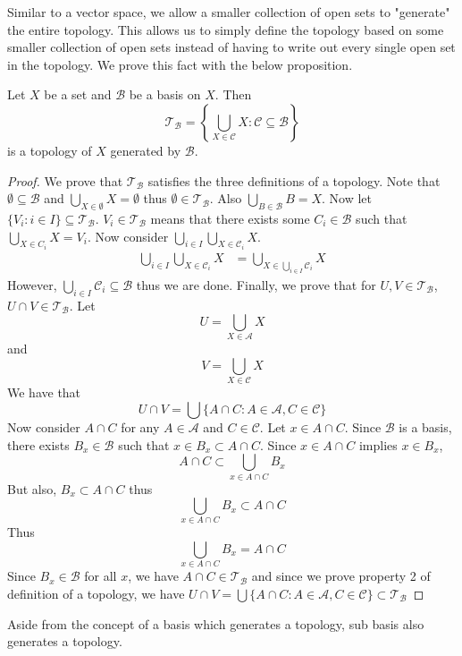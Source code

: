 Similar to a vector space, we allow a smaller collection of open sets to "generate" the entire topology. This allows us to simply define the topology based on some smaller collection of open sets instead of having to write out every single open set in the topology. We prove this fact with the below proposition. 

\begin{prp}{}{} Let $X$ be a set and $\mathcal{B}$ be a basis on $X$. Then $$\mathcal{T}_\mathcal{B}=\left\{\bigcup_{X\in\mathcal{C}}X:\mathcal{C}\subseteq\mathcal{B}\right\}$$ is a topology of $X$ generated by $\mathcal{B}$. \tcbline
\begin{proof} We prove that $\mathcal{T}_\mathcal{B}$ satisfies the three definitions of a topology. Note that $\emptyset\subseteq\mathcal{B}$ and $\bigcup_{X\in\emptyset}X=\emptyset$ thus $\emptyset\in\mathcal{T}_\mathcal{B}$. Also $\bigcup_{B\in\mathcal{B}}B=X$. Now let $\{V_i:i\in I\}\subseteq\mathcal{T}_\mathcal{B}$. $V_i\in\mathcal{T}_\mathcal{B}$ means that there exists some $C_i\in\mathcal{B}$ such that $\bigcup_{X\in C_i}X=V_i$. Now consider $\bigcup_{i\in I}\bigcup_{X\in\mathcal{C}_i}X$. 
\begin{align*}
\bigcup_{i\in I}\bigcup_{X\in\mathcal{C}_i}X&=\bigcup_{X\in\bigcup_{i\in I}\mathcal{C}_i}X
\end{align*} However, $\bigcup_{i\in I}\mathcal{C}_i\subseteq\mathcal{B}$ thus we are done. Finally, we prove that for $U,V\in\mathcal{T}_\mathcal{B}$, $U\cap V\in\mathcal{T}_\mathcal{B}$. Let $$U=\bigcup_{X\in\mathcal{A}}X$$ and $$V=\bigcup_{X\in\mathcal{C}}X$$ We have that $$U\cap V=\bigcup\{A\cap C:A\in\mathcal{A}, C\in\mathcal{C}\}$$ Now consider $A\cap C$ for any $A\in\mathcal{A}$ and $C\in\mathcal{C}$. Let $x\in A\cap C$. Since $\mathcal{B}$ is a basis, there exists $B_x\in\mathcal{B}$ such that $x\in B_x\subset A\cap C$. Since $x\in A\cap C$ implies $x\in B_x$, $$A\cap C\subset\bigcup_{x\in A\cap C}B_x$$ But also, $B_x\subset A\cap C$ thus $$\bigcup_{x\in A\cap C}B_x\subset A\cap C$$ Thus $$\bigcup_{x\in A\cap C}B_x=A\cap C$$ Since $B_x\in\mathcal{B}$ for all $x$, we have $A\cap C\in\mathcal{T}_\mathcal{B}$ and since we prove property 2 of definition of a topology, we have $U\cap V=\bigcup\{A\cap C:A\in\mathcal{A}, C\in\mathcal{C}\}\subset\mathcal{T}_\mathcal{B}$
\end{proof}
\end{prp}

Aside from the concept of a basis which generates a topology, sub basis also generates a topology. 

